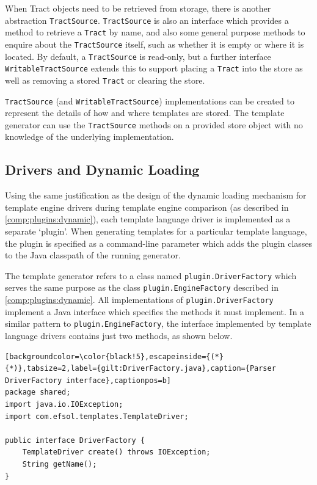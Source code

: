 When Tract objects need to be retrieved from storage, there is another abstraction \verb!TractSource!. \verb!TractSource! is also an interface which provides a method to retrieve a \verb!Tract! by name, and also some general purpose methods to enquire about the \verb!TractSource! itself, such as whether it is empty or where it is located. By default, a \verb!TractSource! is read-only, but a further interface \verb!WritableTractSource! extends this to support placing a \verb!Tract! into the store as well as removing a stored \verb!Tract! or clearing the store.

\verb!TractSource! (and \verb!WritableTractSource!) implementations can be created to represent the details of how and where templates are stored. The template generator can use the \verb!TractSource! methods on a provided store object with no knowledge of the underlying implementation.

\subsection*{Drivers and Dynamic Loading}
\label{gilt:plugins}

Using the same justification as the design of the dynamic loading mechanism for template engine drivers during template engine comparison (as described in \autoref{comp:plugins:dynamic}), each template language driver is implemented as a separate `plugin'. When generating templates for a particular template language, the plugin is specified as a command-line parameter which adds the plugin classes to the Java classpath of the running generator.

The template generator refers to a class named \verb!plugin.DriverFactory! which serves the same purpose as the class \verb!plugin.EngineFactory! described in \autoref{comp:plugins:dynamic}. All implementations of \verb!plugin.DriverFactory! implement a Java interface which specifies the methods it must implement. In a similar pattern to \verb!plugin.EngineFactory!, the interface implemented by template language drivers contains just two methods, as shown below.

\begin{lstlisting}[backgroundcolor=\color{black!5},escapeinside={(*}{*)},tabsize=2,label={gilt:DriverFactory.java},caption={Parser DriverFactory interface},captionpos=b]
package shared;
import java.io.IOException;
import com.efsol.templates.TemplateDriver;

public interface DriverFactory {
	TemplateDriver create() throws IOException;
	String getName();
}
\end{lstlisting}

